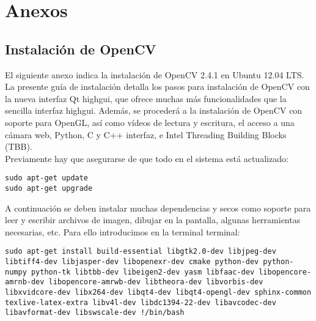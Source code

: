 

\chapter{Anexos}
\label{chap:anexos}

\section{Instalación de OpenCV}

El siguiente anexo indica la instalación de OpenCV 2.4.1 en Ubuntu 12.04 LTS.\\

La presente guía de instalación detalla los pasos para instalación de OpenCV con la nueva interfaz Qt highgui, que ofrece muchas más funcionalidades que la sencilla interfaz highgui. Además, se procederá a la instalación de OpenCV con soporte para OpenGL, así como vídeos de lectura y escritura, el acceso a una cámara web, Python, C y C++ interfaz, e Intel Threading Building Blocks (TBB).\\

Previamente hay que asegurarse de que todo en el sistema está actualizado:\\

\begin{lstlisting}[style=consola]
sudo apt-get update
sudo apt-get upgrade
\end{lstlisting}

A continuación se deben instalar muchas dependencias y secos como soporte para leer y escribir archivos de imagen, dibujar en la pantalla, algunas herramientas necesarias, etc. Para ello introducimos en la terminal terminal:\\

\begin{lstlisting}[style=consola]
sudo apt-get install build-essential libgtk2.0-dev libjpeg-dev libtiff4-dev libjasper-dev libopenexr-dev cmake python-dev python-numpy python-tk libtbb-dev libeigen2-dev yasm libfaac-dev libopencore-amrnb-dev libopencore-amrwb-dev libtheora-dev libvorbis-dev libxvidcore-dev libx264-dev libqt4-dev libqt4-opengl-dev sphinx-common texlive-latex-extra libv4l-dev libdc1394-22-dev libavcodec-dev libavformat-dev libswscale-dev !/bin/bash
\end{lstlisting}

